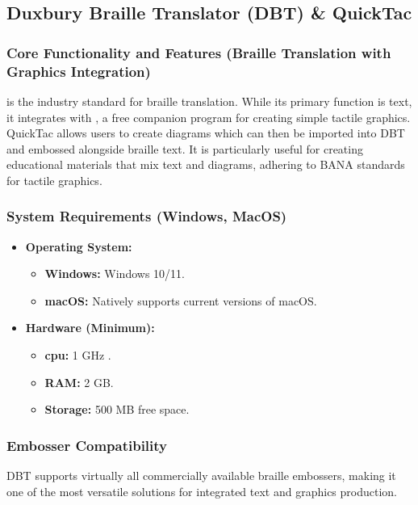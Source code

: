 \subsection{Duxbury Braille Translator (DBT) \& QuickTac}\label{ch14:ssec:dbt-quicktac}
\subsubsection{Core Functionality and Features (Braille Translation with Graphics Integration)}\label{ch14:sssec:dbt-features}
 is the industry standard for braille translation\supercite{DuxburyDBT, DuxburyDBTWin, DuxburyDBTMac}. While its primary function is text, it integrates with , a free companion program for creating simple tactile graphics. QuickTac allows users to create diagrams which can then be imported into DBT and embossed alongside braille text. It is particularly useful for creating educational materials that mix text and diagrams, adhering to BANA standards for tactile graphics.

\subsubsection{System Requirements (Windows, MacOS)}\label{ch14:sssec:dbt-sysreq}
\begin{itemize}
	\item \textbf{Operating System:}
	      \begin{itemize}
		      \item \textbf{Windows:} Windows 10/11.
		      \item \textbf{macOS:} Natively supports current versions of macOS.
	      \end{itemize}
	\item \textbf{Hardware (Minimum):}
	      \begin{itemize}
		      \item \textbf{\gls{cpu}:} 1 GHz .
		      \item \textbf{RAM:} 2 GB.
		      \item \textbf{Storage:} 500 MB free space.
	      \end{itemize}
\end{itemize}

\subsubsection{Embosser Compatibility}\label{ch14:sssec:dbt-compat}
DBT supports virtually all commercially available braille embossers, making it one of the most versatile solutions for integrated text and graphics production\supercite{DuxburyProducts}.

